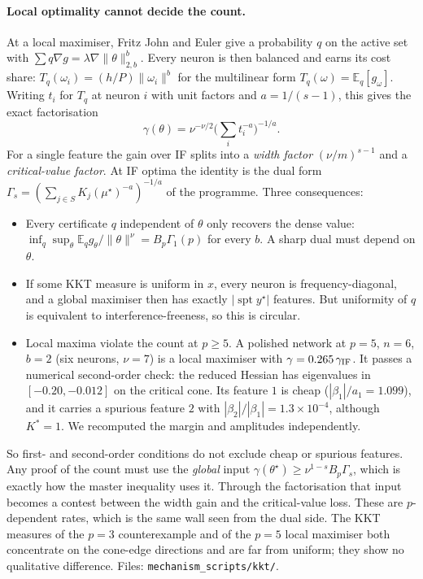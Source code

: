 \documentclass[11pt]{article}
\theoremstyle{definition}
\begin{document}
\paragraph{Local optimality cannot decide the count.}  At a local maximiser, Fritz John and Euler give a probability $q$ on the active set with
$\sum q\nabla g=\lambda\nabla\|\theta\|_{2,b}^b$.  Every neuron is then balanced and earns its cost share: $T_q(\omega_i)=(h/P)\|\omega_i\|^b$ for the
multilinear form $T_q(\omega)=\mathbb E_q[g_\omega]$.  Writing $t_i$ for $T_q$ at neuron $i$ with unit factors and $a=1/(s-1)$, this gives the exact
factorisation
\[\gamma(\theta)=\nu^{-\nu/2}\Big(\sum_it_i^{-a}\Big)^{-1/a}.\]
For a single feature the gain over IF splits into a \emph{width factor} $(\nu/m)^{s-1}$ and a \emph{critical-value factor}.  At IF optima the identity
is the dual form $\Gamma_s=(\sum_{j\in S}K_j(\mu^\star)^{-a})^{-1/a}$ of the programme.  Three consequences:
\begin{itemize}
\item[(i)] Every certificate $q$ independent of $\theta$ only recovers the dense value: $\inf_q\sup_\theta\mathbb E_qg_\theta/\|\theta\|^\nu=B_p\Gamma_1(p)$ for every $b$.
A sharp dual must depend on $\theta$.
\item[(ii)] If some KKT measure is uniform in $x$, every neuron is frequency-diagonal, and a global maximiser then has exactly $|\operatorname{spt}y^\star|$
features.  But uniformity of $q$ is equivalent to interference-freeness, so this is circular.
\item[(iii)] Local maxima violate the count at $p\ge5$.  A polished network at $p=5$, $n=6$, $b=2$ (six neurons, $\nu=7$) is a local maximiser with
$\gamma=0.265\,\gamma_{\rm IF}$.  It passes a numerical second-order check: the reduced Hessian has eigenvalues in $[-0.20,-0.012]$ on the critical
cone.  Its feature $1$ is cheap ($|\beta_1|/a_1=1.099$), and it carries a spurious feature $2$ with $|\beta_2|/|\beta_1|=1.3\times10^{-4}$, although
$K^*=1$.  We recomputed the margin and amplitudes independently.
\end{itemize}
So first- and second-order conditions do not exclude cheap or spurious features.  Any proof of the count must use the \emph{global} input
$\gamma(\theta^\star)\ge\nu^{1-s}B_p\Gamma_s$, which is exactly how the master inequality uses it.  Through the factorisation that input becomes a contest
between the width gain and the critical-value loss.  These are $p$-dependent rates, which is the same wall seen from the dual side.  The KKT measures of
the $p=3$ counterexample and of the $p=5$ local maximiser both concentrate on the cone-edge directions and are far from uniform; they show no
qualitative difference.  Files: \texttt{mechanism\_scripts/kkt/}.
\end{document}
